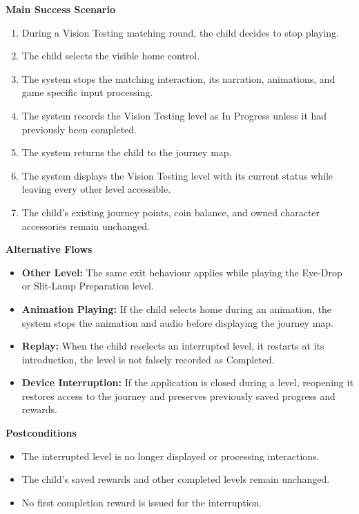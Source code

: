 \documentclass[12pt]{article}
\begin{document}
\textbf{Main Success Scenario}
\begin{enumerate}
    \item During a Vision Testing matching round, the child decides
    to stop playing.
    \item The child selects the visible home control.
    \item The system stops the matching interaction, its narration,
    animations, and game specific input processing.
    \item The system records the Vision Testing level as In Progress
    unless it had previously been completed.
    \item The system returns the child to the journey map.
    \item The system displays the Vision Testing level with its
    current status while leaving every other level accessible.
    \item The child's existing journey points, coin balance, and
    owned character accessories remain unchanged.
\end{enumerate}

\textbf{Alternative Flows}
\begin{itemize}
    \item \textbf{Other Level:} The same exit behaviour applies while
    playing the Eye-Drop or Slit-Lamp Preparation level.
    \item \textbf{Animation Playing:} If the child selects home during
    an animation, the system stops the animation and audio before
    displaying the journey map.
    \item \textbf{Replay:} When the child reselects an interrupted
    level, it restarts at its introduction, the level is not
    falsely recorded as Completed.
    \item \textbf{Device Interruption:} If the application is closed
    during a level, reopening it restores access to the journey
    and preserves previously saved progress and rewards.
\end{itemize}

\textbf{Postconditions}
\begin{itemize}
    \item The interrupted level is no longer displayed or processing
    interactions.
    \item The child's saved rewards and other completed levels
    remain unchanged.
    \item No first completion reward is issued for the interruption.
\end{itemize}
\end{document}
